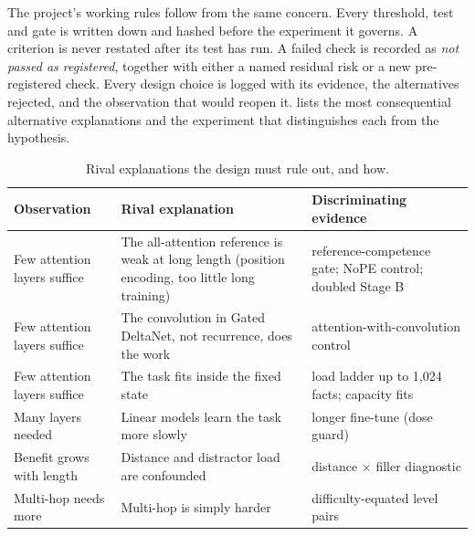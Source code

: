 \documentclass[10pt,a4paper]{article}
\begin{document}
The project's working rules follow from the same concern. Every threshold, test and gate is
written down and hashed before the experiment it governs. A criterion is never restated after its
test has run. A failed check is recorded as \emph{not passed as registered}, together with either
a named residual risk or a new pre-registered check. Every design choice is logged with its
evidence, the alternatives rejected, and the observation that would reopen it.
 lists the most consequential alternative explanations and the experiment that
distinguishes each from the hypothesis.

\begin{table}[t]
\centering\tablefont
\caption{Rival explanations the design must rule out, and how.}
\label{tab:rivals}
\begin{tabularx}{\textwidth}{@{}>{\raggedright\arraybackslash}p{3.3cm} X >{\raggedright\arraybackslash}p{3.9cm}@{}}
\toprule
Observation & Rival explanation & Discriminating evidence \\
\midrule
Few attention layers suffice & The all-attention reference is weak at long length (position encoding, too little long training) & reference-competence gate; NoPE control; doubled Stage B \\
Few attention layers suffice & The convolution in Gated DeltaNet, not recurrence, does the work & attention-with-convolution control \\
Few attention layers suffice & The task fits inside the fixed state & load ladder up to 1,024 facts; capacity fits \\
Many layers needed & Linear models learn the task more slowly & longer fine-tune (dose guard) \\
Benefit grows with length & Distance and distractor load are confounded & distance $\times$ filler diagnostic \\
Multi-hop needs more & Multi-hop is simply harder & difficulty-equated level pairs \\
\bottomrule
\end{tabularx}
\end{table}
\end{document}
